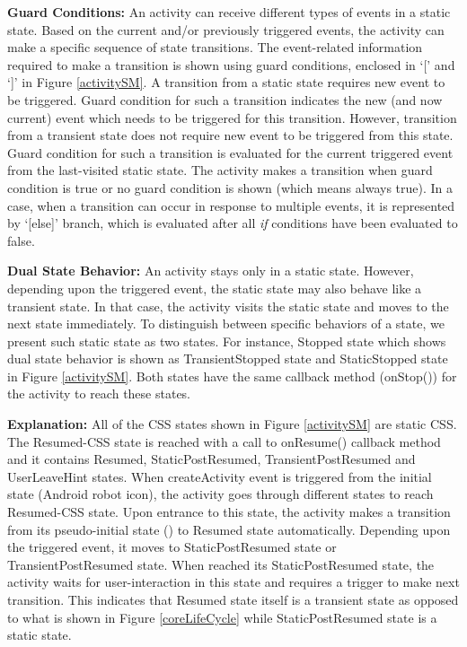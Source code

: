 \documentclass[10pt]{elsarticle}
\begin{document}
{\noindent \bf Guard Conditions:} An activity can receive different types of events in a static state. Based on the current and/or previously triggered events, the activity can make a specific sequence of state transitions. The event-related information required to make a transition is shown using guard conditions, enclosed in `[' and `]' in Figure \ref{activitySM}. A transition from a static state requires new event to be triggered. Guard condition for such a transition indicates the new (and now current) event which needs to be triggered for this transition. However, transition from a transient state does not require new event to be triggered from this state. Guard condition for such a transition is evaluated for the current triggered event from the last-visited static state. The activity makes a transition when guard condition is true or no guard condition is shown (which means always true). In a case, when a transition can occur in response to multiple events, it is represented by `[else]' branch, which is evaluated after all \emph{if} conditions have been evaluated to false. 

{\noindent \bf Dual State Behavior:} An activity stays only in a static state. However, depending upon the triggered event, the static state may also behave like a transient state. In that case, the activity visits the static state and moves to the next state immediately. To distinguish between specific behaviors of a state, we present such static state as two states. For instance, Stopped state which shows dual state behavior is shown as TransientStopped state and StaticStopped state in Figure \ref{activitySM}. Both states have the same callback method ({\ttfamily onStop()}) for the activity to reach these states. 

{\noindent \bf Explanation:} All of the CSS states shown in Figure \ref{activitySM} are static CSS. The Resumed-CSS state is reached with a call to {\ttfamily onResume()} callback method and it contains Resumed, StaticPostResumed, TransientPostResumed and UserLeaveHint states. When createActivity event is triggered from the initial state (Android robot icon), the activity goes through different states to reach Resumed-CSS state. Upon entrance to this state, the activity makes a transition from its pseudo-initial state (\bulletarrow) to Resumed state automatically. Depending upon the triggered event, it moves to StaticPostResumed state or TransientPostResumed state. When reached its StaticPostResumed state, the activity waits for user-interaction in this state and requires a trigger to make next transition. This indicates that Resumed state itself is a transient state as opposed to what is shown in Figure \ref{coreLifeCycle} while StaticPostResumed state is a static state. 
\end{document}
